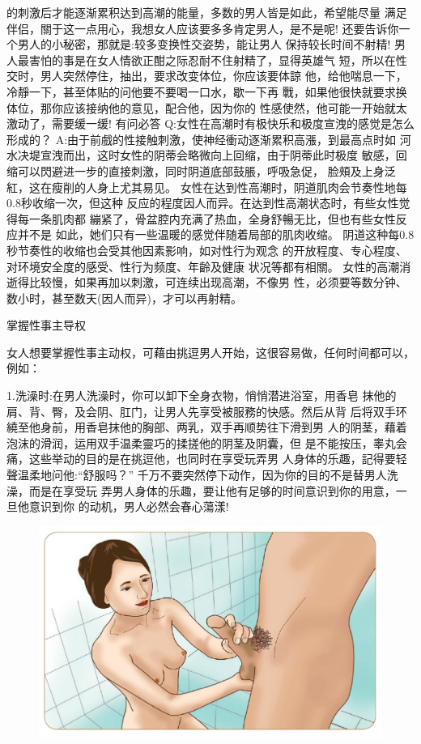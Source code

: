 \documentclass[12pt,UTF8]{ctexbook}
\begin{document}
的刺激后才能逐渐累积达到高潮的能量，多数的男人皆是如此，希望能尽量
满足伴侣，關于这一点用心，我想女人应该要多多肯定男人，是不是呢!
还要告诉你一个男人的小秘密，那就是:较多变换性交姿势，能让男人
保持较长时间不射精!
男人最害怕的事是在女人情欲正酣之际忍耐不住射精了，显得英雄气
短，所以在性交时，男人突然停住，抽出，要求改变体位，你应该要体諒
他，给他喘息一下，冷靜一下，甚至体贴的问他要不要喝一口水，歇一下再
戰，如果他很快就要求换体位，那你应该接纳他的意见，配合他，因为你的
性感使然，他可能一开始就太激动了，需要缓一缓!
有问必答
Q:女性在高潮时有极快乐和极度宣洩的感觉是怎么形成的？
A:由于前戲的性接触刺激，使神经衝动逐渐累积高漲，到最高点时如
河水决堤宣洩而出，这时女性的阴蒂会略微向上回缩，由于阴蒂此时极度
敏感，回缩可以閃避进一步的直接刺激，同时阴道底部鼓脹，呼吸急促，
脸頰及上身泛紅，这在瘦削的人身上尤其易见。
女性在达到性高潮时，阴道肌肉会节奏性地每0.8秒收缩一次，但这种
反应的程度因人而异。在达到性高潮状态时，有些女性觉得每一条肌肉都
繃紧了，骨盆腔内充满了热血，全身舒暢无比，但也有些女性反应并不是
如此，她们只有一些温暖的感觉伴随着局部的肌肉收缩。
阴道这种每0.8秒节奏性的收缩也会受其他因素影响，如对性行为观念
的开放程度、专心程度、对环境安全度的感受、性行为频度、年齡及健康
状况等都有相關。
女性的高潮消逝得比较慢，如果再加以刺激，可连续出现高潮，不像男
性，必须要等数分钟、数小时，甚至数天(因人而异)，才可以再射精。

掌握性事主导权

女人想要掌握性事主动权，可藉由挑逗男人开始，这很容易做，任何时间都可以，例如：

1.洗澡时:在男人洗澡时，你可以卸下全身衣物，悄悄潜进浴室，用香皂
抹他的肩、背、臀，及会阴、肛门，让男人先享受被服務的快感。然后从背
后将双手环繞至他身前，用香皂抹他的胸部、两乳，双手再顺势往下滑到男
人的阴茎，藉着泡沫的滑润，运用双手温柔靈巧的揉搓他的阴茎及阴囊，但
是不能按压，睾丸会痛，这些举动的目的是在挑逗他，也同时在享受玩弄男
人身体的乐趣，記得要轻聲温柔地问他:“舒服吗？”
千万不要突然停下动作，因为你的目的不是替男人洗澡，而是在享受玩
弄男人身体的乐趣，要让他有足够的时间意识到你的用意，一旦他意识到你
的动机，男人必然会春心蕩漾!

\begin{figure}[htbp]
	\centering
	\includegraphics[width=0.7\linewidth]{14}
	\caption{}
	\label{fig:1}
\end{figure}
\end{document}
